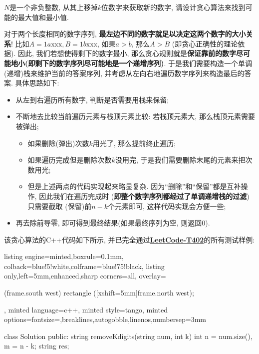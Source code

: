 \documentclass{article}
\begin{document}
\pagebreak



\begin{homeworkProblem}
    $N$是一个非负整数, 从其上移掉$k$位数字来获取新的数字, 请设计贪心算法来找到可能的最大值和最小值.

    \solution 对于两个长度相同的数字序列, \textbf{最左边不同的数字就足以决定这两个数字的大小关系}! 比如$A=1a\text{xxx},B=1b\text{xxx}$, 如果$a>b$, 那么$A>B$ (即贪心正确性的理论依据). 因此, 我们若想使得剩下的数字最小, 那么贪心规则就是\textbf{保证靠前的数字尽可能地小(即剩下的数字序列尽可能地是一个递增序列)}. 于是我们需要构造一个单调(递增)栈来维护当前的答案序列, 并考虑从左向右地遍历数字序列来构造最后的答案. 具体思路如下:
    \begin{itemize}
        \item 从左到右遍历所有数字, 判断是否需要用栈来保留;
        \item 不断地去比较当前遍历元素与栈顶元素比较: 若栈顶元素大, 那么栈顶元素需要被弹出;
        \begin{itemize}
            \item 如果删除(弹出)次数$k$用光了, 那么提前终止遍历;
            \item 如果遍历完成但是删除次数$k$没用完, 于是我们需要删除末尾的元素来把次数用光;
            \item 但是上述两点的代码实现起来略显复杂. 因为“删除”和“保留”都是互补操作, 因此我们在遍历完成时 (\textbf{即整个数字序列都经过了单调递增栈的过滤})只需要截取 (保留)前$n-k$个元素即可, 这样代码实现会方便一些;
        \end{itemize}
        \item 再去除前导零, 即可得到最终结果(如果最终序列为空, 则返回0).
    \end{itemize}
    该贪心算法的C++代码如下所示, 并已完全通过\href{https://leetcode.cn/problems/remove-k-digits/description/}{\textbf{LeetCode-T402}}的所有测试样例:
\begin{tcblisting}{listing engine=minted,boxrule=0.1mm,
colback=blue!5!white,colframe=blue!75!black,
listing only,left=5mm,enhanced,sharp corners=all,
overlay={\begin{tcbclipinterior} (frame.south west)
rectangle ([xshift=5mm]frame.north west);\end{tcbclipinterior}},
minted language=c++,
minted style=tango,
minted options={fontsize=\small,breaklines,autogobble,linenos,numbersep=3mm}}
class Solution {
public:
    string removeKdigits(string num, int k) {
        int n = num.size(), m = n - k;
        string res;
}}
\end{tcblisting}
\end{homeworkProblem}
\end{document}
